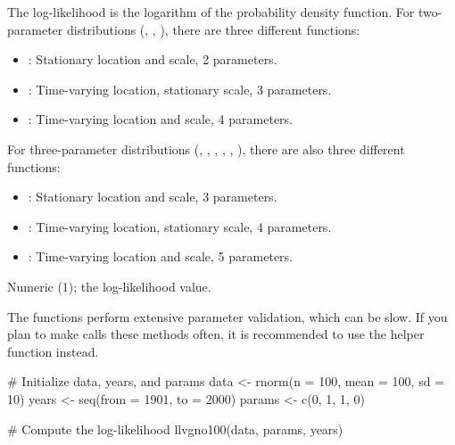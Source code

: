 \documentclass[a4paper]{book}
\begin{document}
%
\begin{Details}
The log-likelihood is the logarithm of the probability density function.
For two-parameter distributions (, , ), there are three
different  functions:
\begin{itemize}

\item{} : Stationary location and scale, 2 parameters.
\item{} : Time-varying location, stationary scale, 3 parameters.
\item{} : Time-varying location and scale, 4 parameters.

\end{itemize}


For three-parameter distributions (, , , , , ),
there are also three different  functions:
\begin{itemize}

\item{} : Stationary location and scale, 3 parameters.
\item{} : Time-varying location, stationary scale, 4 parameters.
\item{} : Time-varying location and scale, 5 parameters.

\end{itemize}

\end{Details}
%
\begin{Value}
Numeric (1); the log-likelihood value.
\end{Value}
%
\begin{Note}
The  functions perform extensive parameter validation, which can be slow.
If you plan to make calls these methods often, it is recommended to use the 
helper function instead.
\end{Note}
%
\begin{SeeAlso}
\end{SeeAlso}
%
\begin{Examples}
\begin{ExampleCode}
# Initialize data, years, and params
data <- rnorm(n = 100, mean = 100, sd = 10)
years <- seq(from = 1901, to = 2000)
params <- c(0, 1, 1, 0)

# Compute the log-likelihood
llvgno100(data, params, years)

\end{ExampleCode}
\end{Examples}
\end{document}
